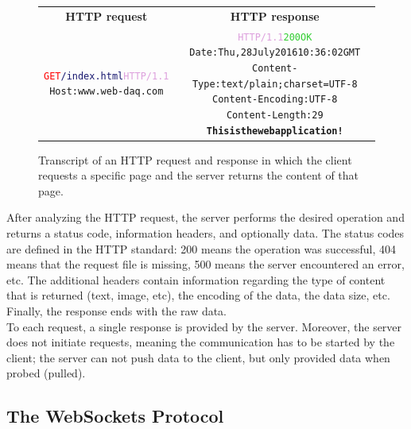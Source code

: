       \begin{figure}[h!]
        \begin{tabularx}{\textwidth}{C{1}C{1}}
          \textbf{HTTP request} & \textbf{HTTP response} \\
        { \footnotesize
\begin{alltt}
\textcolor{Red}{GET} \textcolor{MidnightBlue}{/index.html} \textcolor{Plum}{HTTP/1.1} \newline
\textcolor{BurntOrange}{Host:} www.web-daq.com
\end{alltt} } & { \footnotesize
\begin{alltt}
\textcolor{Plum}{HTTP/1.1} \textcolor{LimeGreen}{200 OK} \newline
\textcolor{BurntOrange}{Date:} Thu, 28 July 2016 10:36:02 GMT \newline
\textcolor{BurntOrange}{Content-Type:} text/plain; charset=UTF-8 \newline
\textcolor{BurntOrange}{Content-Encoding:} UTF-8 \newline
\textcolor{BurntOrange}{Content-Length:} 29 \newline
\textbf{This is the web application !}
\end{alltt} }
        \end{tabularx}
        \caption{Transcript of an HTTP request and response in which the client requests a specific page and the server returns the content of that page.}
        \label{fig:III-2-http}
      \end{figure}

      After analyzing the HTTP request, the server performs the desired operation and returns a status code, information headers, and optionally data. The status codes are defined in the HTTP standard: 200 means the operation was successful, 404 means that the request file is missing, 500 means the server encountered an error, etc. The additional headers contain information regarding the type of content that is returned (text, image, etc), the encoding of the data, the data size, etc. Finally, the response ends with the raw data. \\

      To each request, a single response is provided by the server. Moreover, the server does not initiate requests, meaning the communication has to be started by the client; the server can not push data to the client, but only provided data when probed (pulled).

    \subsection{The WebSockets Protocol}

